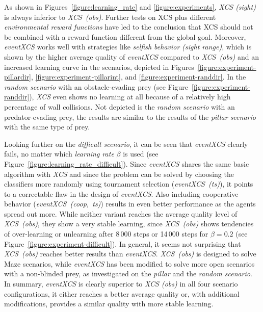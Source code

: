 \documentclass{sig-alternate}
\begin{document}
As shown in Figures~\ref{figure:learning_rate} and \ref{figure:experiments}, \emph{XCS (sight)} is always inferior to \emph{XCS~(obs)}. Further tests on XCS plus different \emph{environmental reward functions} have led to the conclusion that XCS should not be combined with a reward function different from the global goal. Moreover, \emph{eventXCS} works well with strategies like \emph{selfish behavior (sight range)}, which is shown by the higher average quality of \emph{eventXCS} compared to \emph{XCS~(obs)} and an increased learning curve in the scenarios, depicted in Figures~\ref{figure:experiment-pillardir}, \ref{figure:experiment-pillarint}, and \ref{figure:experiment-randdir}. In the \emph{random scenario} with an obstacle-evading prey (see Figure~\ref{figure:experiment-randdir}), \emph{XCS} even shows no learning at all because of a relatively high percentage of wall collisions. Not depicted is the \emph{random scenario} with an predator-evading prey, the results are similar to the results of the \emph{pillar scenario} with the same type of prey.

Looking further on the \emph{difficult scenario}, it can be seen that \emph{eventXCS} clearly fails, no matter which \emph{learning rate} $\beta$ is used (see Figure~\ref{figure:learning_rate_difficult}). Since \emph{eventXCS} shares the same basic algorithm with \emph{XCS} and since the problem can be solved by choosing the classifiers more randomly using tournament selection (\emph{eventXCS~(ts)}), it points to a correctable flaw in the design of \emph{eventXCS}. Also including cooperative behavior (\emph{eventXCS~(coop,~ts)}) results in even better performance as the agents spread out more. While neither variant reaches the average quality level of \emph{XCS~(obs)}, they show a very stable learning, since \emph{XCS~(obs)} shows tendencies of over-learning or unlearning after 8\,000 steps or 14\,000 steps for $\beta = 0.2$ (see Figure~\ref{figure:experiment-difficult}). In general, it seems not surprising that \emph{XCS~(obs)} reaches better results than \emph{eventXCS}. \emph{XCS~(obs)} is designed to solve Maze scenarios, while \emph{eventXCS} has been modified to solve more open scenarios with a non-blinded prey, as investigated on the \emph{pillar} and the \emph{random scenario}. In summary, \emph{eventXCS} is clearly superior to \emph{XCS (obs)} in all four scenario configurations, it either reaches a better average quality or, with additional modifications, provides a similar quality with more stable learning.
\end{document}
